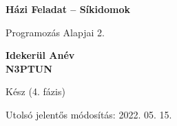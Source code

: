 
\begin{titlepage}
    \begin{center}
        \vspace*{1cm}
            
        \Huge
        \textbf{Házi Feladat – Síkidomok}
            
        \vspace{0.5cm}
        \LARGE
        Programozás Alapjai 2.
            
        \vspace{2.5cm}
            
        \textbf{Idekerül Anév}\\
        \textbf{N3PTUN}
            
        \vfill
            
        Kész (4. fázis)
            
        \vspace{0.8cm}
            
            
        \Large
        Utolsó jelentős módosítás: 2022. 05. 15.
        \vspace*{1cm}
            
    \end{center}
\end{titlepage}
